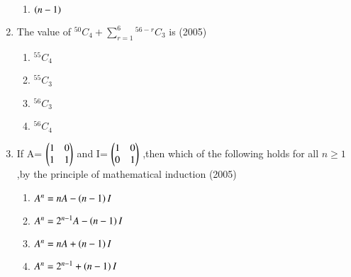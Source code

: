 \documentclass[journal,12pt,twocolumn]{IEEEtran}
\theoremstyle{remark}
\begin{document}
\begin{enumerate}
\begin{enumerate}
        \item$\left(n-1\right)$\\
    \end{enumerate}
    \item The value of $^{50}C_{4}+\sum_{r=1}^{6}$$^{56-r}C_{3}$ is
        \hfill(2005)
    \begin{enumerate}
        \item$^{55}C_{4}$\\
        \item$^{55}C_{3}$\\
        \item$^{56}C_{3}$\\
        \item$^{56}C_{4}$\\
    \end{enumerate}
    \item If A=
                 $\begin{pmatrix}
                 1 & 0\\
                 1 & 1\\
                 \end{pmatrix}$
                       and I=
                          $\begin{pmatrix}
                          1 & 0\\
                          0 & 1\\
                          \end{pmatrix}$
                    ,then which of the following holds for all $n\ge1$,by the principle of mathematical induction
                    \hfill(2005)
                    \begin{enumerate}
        \item$A^{n}=nA-\left(n-1\right)I$\\
        \item$A^n=2^{n-1}A-\left(n-1\right)I$\\
        \item$A^n=nA+\left(n-1\right)I$\\
        \item$A^n=2^{n-1}+\left(n-1\right)I$\\
    \end{enumerate}
    

\end{enumerate}
\end{document}
